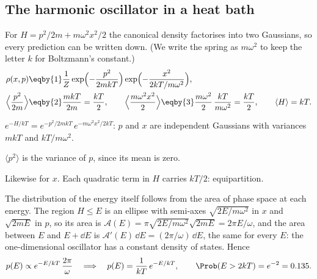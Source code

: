 \subsection{The harmonic oscillator in a heat bath}
\label{9b:sec:canon-osc}

For $H=p^2/2m+m\omega^2x^2/2$ the canonical density factorises into two Gaussians, so every
prediction can be written down. (We write the spring as $m\omega^2$ to keep the letter $k$ for
Boltzmann's constant.)
\begin{align}
  \rho(x,p)
  &\eqby{1}\frac1Z\exp\Bigl(-\frac{p^2}{2mkT}\Bigr)\exp\Bigl(-\frac{x^2}{2kT/m\omega^2}\Bigr),
  \nonumber\\
  \Bigl\langle\frac{p^2}{2m}\Bigr\rangle
  &\eqby{2}\frac{mkT}{2m}=\frac{kT}2,
  \qquad
  \Bigl\langle\frac{m\omega^2x^2}{2}\Bigr\rangle
   \eqby{3}\frac{m\omega^2}{2}\,\frac{kT}{m\omega^2}=\frac{kT}2,
  \qquad
  \langle H\rangle=kT .
  \label{9b:eq:equipartition}
\end{align}
\begin{explain}
  \item $e^{-H/kT}=e^{-p^2/2mkT}\,e^{-m\omega^2x^2/2kT}$: $p$ and $x$ are independent Gaussians
        with variances $mkT$ and $kT/m\omega^2$.
  \item $\langle p^2\rangle$ is the variance of $p$, since its mean is zero.
  \item Likewise for $x$. Each quadratic term in $H$ carries $kT/2$: equipartition.
\end{explain}
The distribution of the energy itself follows from the area of phase space at each energy. The
region $H\le E$ is an ellipse with semi-axes $\sqrt{2E/m\omega^2}$ in $x$ and $\sqrt{2mE}$ in $p$,
so its area is $\mathcal A(E)=\pi\sqrt{2E/m\omega^2}\sqrt{2mE}=2\pi E/\omega$, and the area
between $E$ and $E+\dd E$ is $\mathcal A'(E)\,\dd E=(2\pi/\omega)\,\dd E$, the same for every
$E$: the one-dimensional oscillator has a constant density of states. Hence
\begin{equation}
  p(E)\propto e^{-E/kT}\,\frac{2\pi}{\omega}
  \quad\Longrightarrow\quad
  p(E)=\frac{1}{kT}\,e^{-E/kT},\qquad \Prob(E>2kT)=e^{-2}=0.135 .
  \label{9b:eq:energy-dist}
\end{equation}

